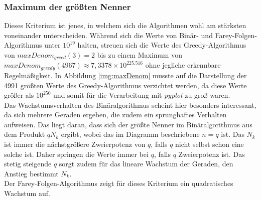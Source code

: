 \subsubsection{Maximum der größten Nenner}
Dieses Kriterium ist jenes, in welchem sich die Algorithmen wohl am stärksten voneinander unterscheiden. Während sich die Werte von Binär- und Farey-Folgen-Algorithmus unter $10^{19}$ halten, streuen sich die Werte des Greedy-Algorithmus von $maxDenom_{greed}(3) = 2$ bis zu einem Maximum von $maxDenom_{greedy}(4967) \approx 7,3378 \times 10^{225.516}$ ohne jegliche erkennbare Regelmäßigkeit. In Abbildung \ref{img:maxDenom} musste auf die Darstellung der 4991 größten Werte des Greedy-Algorithmus verzichtet werden, da diese Werte größer als $10^{250}$ und somit für die Verarbeitung mit \emph{pyplot} zu groß waren.\\
Das Wachstumsverhalten des Binäralgorithmus scheint hier besonders interessant, da sich mehrere Geraden ergeben, die zudem ein sprunghaftes Verhalten aufweisen. Das liegt daran, dass sich der größte Nenner im Binäralgorithmus aus dem Produkt $qN_k$ ergibt, wobei das im Diagramm beschriebene $n=q$ ist. Das $N_k$ ist immer die nächstgrößere Zweierpotenz von $q$, falls $q$ nicht selbst schon eine solche ist. Daher springen die Werte immer bei $q$, falls $q$ Zweierpotenz ist. Das stetig steigende $q$ sorgt zudem für das lineare Wachstum der Geraden, den Anstieg bestimmt $N_k$.\\
Der Farey-Folgen-Algorithmus zeigt für dieses Kriterium ein  quadratisches Wachstum auf.


